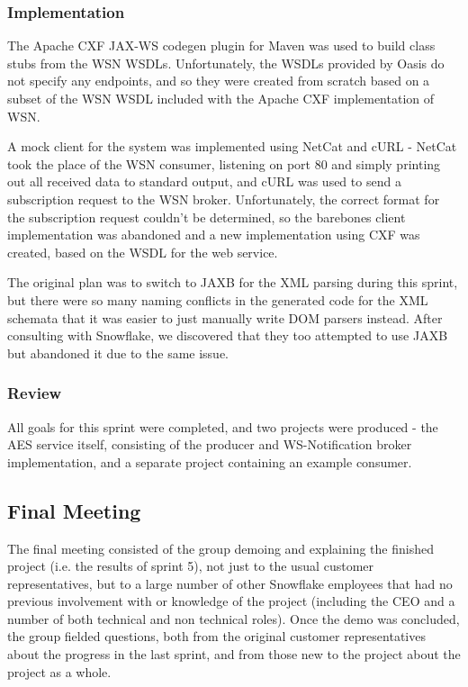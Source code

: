 \documentclass[a4paper, 12pt, twoside]{article}
\begin{document}
\subsubsection{Implementation}

The Apache CXF JAX-WS codegen plugin for Maven was used to build class stubs from the WSN WSDLs. Unfortunately, the WSDLs provided by Oasis do not specify any endpoints, and so they were created from scratch based on a subset of the WSN WSDL included with the Apache CXF implementation of WSN.

A mock client for the system was implemented using NetCat and cURL - NetCat took the place of the WSN consumer, listening on port 80 and simply printing out all received data to standard output, and cURL was used to send a subscription request to the WSN broker. Unfortunately, the correct format for the subscription request couldn't be determined, so the barebones client implementation was abandoned and a new implementation using CXF was created, based on the WSDL for the web service.

The original plan was to switch to JAXB for the XML parsing during this sprint, but there were so many naming conflicts in the generated code for the XML schemata that it was easier to just manually write DOM parsers instead. After consulting with Snowflake, we discovered that they too attempted to use JAXB but abandoned it due to the same issue.

\subsubsection{Review}

All goals for this sprint were completed, and two projects were produced - the AES service itself, consisting of the producer and WS-Notification broker implementation, and a separate project containing an example consumer.

\subsection{Final Meeting}
\label{sec:impl_final_meeting}

The final meeting consisted of the group demoing and explaining the finished project (i.e. the results of sprint 5), not just to the usual customer representatives, but to a large number of other Snowflake employees that had no previous involvement with or knowledge of the project (including the CEO and a number of both technical and non technical roles). Once the demo was concluded, the group fielded questions, both from the original customer representatives about the progress in the last sprint, and from those new to the project about the project as a whole.
\end{document}
